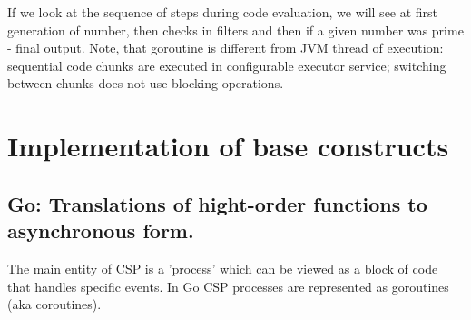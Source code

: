 \documentclass[12pt]{article}
\begin{document}
  If we look at the sequence of steps during code evaluation, we will see at first generation of
number, then checks in filters and then if a given number was prime - final output.  Note, that goroutine is different from JVM thread of execution: sequential code chunks are executed in configurable executor service; switching between chunks does not use blocking operations.

\section{Implementation of base constructs }


\subsection{Go: Translations of hight-order functions to asynchronous form.}

 The main entity of CSP is a 'process' which can be viewed as a block of code that handles specific events.  In Go CSP processes are represented as goroutines (aka coroutines). 
\end{document}
